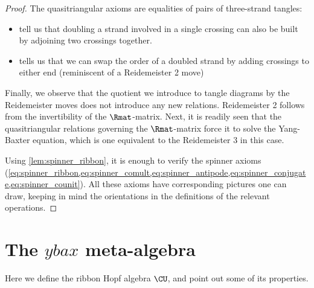 \begin{proof}
        The quasitriangular axioms are equalities of pairs of three-strand
        tangles:
        \begin{itemize}
                \item {} tell us that
                        doubling a strand involved in a single crossing can also
                        be built by adjoining two crossings together.
                \item {} tells us that we can swap the order
                        of a doubled strand by adding crossings to either end
                        (reminiscent of a Reidemeister 2 move)
        \end{itemize}

        Finally, we observe that the quotient we introduce to tangle diagrams by
        the Reidemeister moves does not introduce any new relations.
        Reidemeister 2 follows from the invertibility of the $\Rmat$-matrix.
        Next, it is readily seen that the quasitriangular relations governing
        the $\Rmat$-matrix force it to solve the Yang-Baxter equation, which is
        one equivalent to the Reidemeister 3 in this case.

        Using \cref{lem:spinner_ribbon}, it is enough to verify the spinner
        axioms
        (\cref{eq:spinner_ribbon,eq:spinner_comult,eq:spinner_antipode,eq:spinner_conjugate,eq:spinner_counit}).
        All these axioms have corresponding pictures one can draw, keeping in
        mind the orientations in the definitions of the relevant operations.
\end{proof}

\section{The $ybax$ meta-algebra}\label{sec:algebraic-definitions}

Here we define the ribbon Hopf algebra $\CU$, and point out some of its
properties.

